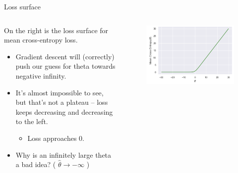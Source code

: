 \documentclass[aspectratio=169]{../latex_main/tntbeamer}  %
\begin{document}
	
	\begin{frame}{Loss surface}
    

	    \begin{columns}
	        \begin{column}{.5\textwidth}
	            On the right is the loss surface for mean cross-entropy loss.
	            \begin{itemize}
	                \item Gradient descent will (correctly) push our guess for theta towards negative infinity.
	                \item It’s almost impossible to see, but that’s not a plateau – loss keeps decreasing and decreasing to the left.
	                \begin{itemize}
	                    \item Loss approaches 0.
	                \end{itemize}
	                \item Why is an infinitely large theta a bad idea? (     $\hat{\theta} \rightarrow -\infty$             )

	            \end{itemize}  
	        \end{column}
	        
	        
	        
	        \begin{column}{.5\textwidth}
	                \begin{figure}
	                    \centering
	                    \includegraphics[scale=.5]{Bild42}
	                \end{figure}
	                
	        \end{column}
	    \end{columns}
	 \end{frame}
	 
\end{document}
